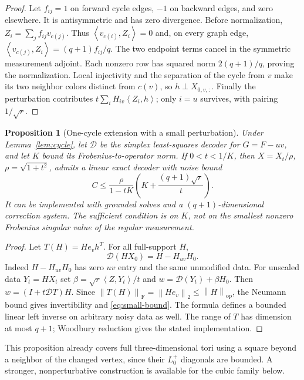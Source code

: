 \documentclass[11pt]{article}
\newtheorem{proposition}[theorem]{Proposition}
\theoremstyle{remark}\newtheorem{remark}[theorem]{Remark}
\newcommand{\op}{\mathrm{op}}
\newcommand{\F}{\mathrm F}
\newcommand{\norm}[1]{\left\lVert #1\right\rVert}
\newcommand{\ip}[2]{\left\langle #1,#2\right\rangle}
\begin{document}
\begin{proof}
Let $f_{ij}=1$ on forward cycle edges, $-1$ on backward edges, and zero elsewhere. It is antisymmetric and has zero divergence. Before normalization, $Z_i=\sum_jf_{ij}v_{c(j)}$. Thus $\ip{v_{c(i)}}{Z_i}=0$ and, on every graph edge,
$\ip{v_{c(j)}}{Z_i}=(q+1)f_{ij}/q$. The two endpoint terms cancel in the symmetric measurement adjoint. Each nonzero row has squared norm $2(q+1)/q$, proving the normalization. Local injectivity and the separation of the cycle from $v$ make its two neighbor colors distinct from $c(v)$, so $h\perp X_{0,v,:}$. Finally the perturbation contributes $t\sum_iH_{iv}\ip{Z_i}{h}$; only $i=u$ survives, with pairing $1/\sqrt r$.
\end{proof}

\begin{proposition}[One-cycle extension with a small perturbation]\label{prop:onecycle}
Under Lemma~\ref{lem:cycle}, let $\mathcal D$ be the simplex least-squares decoder for $G=F-uv$, and let $K$ bound its Frobenius-to-operator norm. If $0<t<1/K$, then $X=X_t/\rho$, $\rho=\sqrt{1+t^2}$, admits a linear exact decoder with noise bound
\begin{equation}\label{eq:small-bound}
C\leq\frac{\rho}{1-tK}\left(K+\frac{(q+1)\sqrt r}{t}\right).
\end{equation}
It can be implemented with grounded solves and a $(q+1)$-dimensional correction system. The sufficient condition is on $K$, not on the smallest nonzero Frobenius singular value of the regular measurement.
\end{proposition}

\begin{proof}
Let $T(H)=He_vh^T$. For all full-support $H$,
\[
\mathcal D(HX_0)=H-H_{uv}H_0.
\]
Indeed $H-H_{uv}H_0$ has zero $uv$ entry and the same unmodified data. For unscaled data $Y_t=HX_t$ set
$\beta=\sqrt r\ip Z{Y_t}/t$ and $w=\mathcal D(Y_t)+\beta H_0$. Then
$w=(I+t\mathcal DT)H$. Since $\norm{T(H)}_{\F}=\norm{He_v}_2\leq\norm H_{\op}$, the Neumann bound gives invertibility and \eqref{eq:small-bound}. The formula defines a bounded linear left inverse on arbitrary noisy data as well. The range of $T$ has dimension at most $q+1$; Woodbury reduction gives the stated implementation.
\end{proof}

This proposition already covers full three-dimensional tori using a square beyond a neighbor of the changed vertex, since their $L_0^+$ diagonals are bounded. A stronger, nonperturbative construction is available for the cubic family below.
\end{document}
